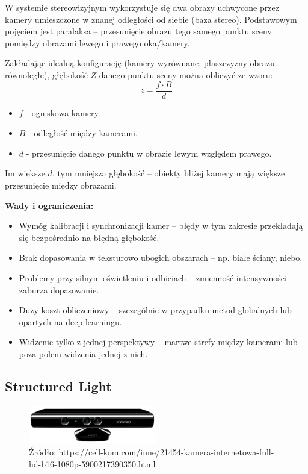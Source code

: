 \documentclass[magisterska]{pracadypl}
\begin{document}
W systemie stereowizyjnym wykorzystuje się dwa obrazy uchwycone przez kamery umieszczone w znanej odległości od siebie (baza stereo). Podstawowym pojęciem jest paralaksa – przesunięcie obrazu tego samego punktu sceny pomiędzy obrazami lewego i prawego oka/kamery.

Zakładając idealną konfigurację (kamery wyrównane, płaszczyzny obrazu równoległe), głębokość $Z$ danego punktu sceny można obliczyć ze wzoru:
\[
z = \frac{f \cdot B}{d}
\]
\begin{itemize}
  \item $f$ - ogniskowa kamery.
  \item $B$ - odległość między kamerami.
  \item $d$ - przesunięcie danego punktu w obrazie lewym względem prawego.
\end{itemize}

Im większe $d$, tym mniejsza głębokość – obiekty bliżej kamery mają większe przesunięcie między obrazami.

\begin{minipage}[t]{\textwidth}
\textbf{Wady i ograniczenia:}
\begin{itemize}
  \item Wymóg kalibracji i synchronizacji kamer – błędy w tym zakresie przekładają się bezpośrednio na błędną głębokość.

  \item Brak dopasowania w teksturowo ubogich obszarach – np. białe ściany, niebo.

  \item Problemy przy silnym oświetleniu i odbiciach – zmienność intensywności zaburza dopasowanie.

  \item Duży koszt obliczeniowy – szczególnie w przypadku metod globalnych lub opartych na deep learningu.

  \item Widzenie tylko z jednej perspektywy – martwe strefy między kamerami lub poza polem widzenia jednej z nich.
\end{itemize}
\end{minipage}

\subsection{Structured Light}

\begin{figure}[h]  %
    \centering  %
    \includegraphics[width=0.5\textwidth]{images/POINTCLOUD.png}  %
    \captionsetup{labelformat=empty, font=footnotesize}
    \caption{Źródło: https://cell-kom.com/inne/21454-kamera-internetowa-full-hd-b16-1080p-5900217390350.html}
    \label{fig:mono}  %
\end{figure}
\end{document}
